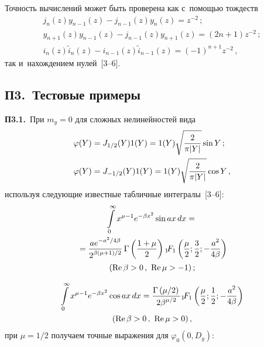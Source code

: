 \begin{multicols}{2}
{Точность вычислений может быть проверена как с~по\-мощью тождеств
    \begin{gather*}
    j_n (z) y_{n-1}(z) - j_{n-1}(z) y_n(z) = z^{-2}\,;
    \\[2pt]
    y_{n+1}(z) y_{n-1}(z) - j_{n-1}(z) y_{n+1}(z) =(2n+1) z^{-2}\,;
\\[2pt]
    i_n(z) \tilde i_n (z) - i_{n-1}(z) \tilde i_{n-1}(z) =(-1)^{n+1} z^{-2}\,,
  \end{gather*}
так и~нахождением нулей~[3--6].

\vspace*{2pt}


 


\subsection*{П3.\ Тестовые примеры}

\vspace*{6pt}


\noindent
\textbf{П3.1.}\ 
При $m_y =0$ для сложных нелинейностей вида
    \begin{align*}
    \varphi(Y) &= J_{1/2} (Y) 1(Y) = 1(Y)\sqrt{
    \displaystyle\frac{\displaystyle 2\mathstrut}{\displaystyle \pi |Y|\mathstrut}}\sin Y\,;\\
    \varphi(Y) &= J_{-1/2} (Y) 1(Y) =1(Y)\sqrt{\displaystyle\frac{\displaystyle 2\mathstrut}{\displaystyle \pi |Y|\mathstrut}}\cos Y\,,
\end{align*}
используя следующие известные табличные интегралы~[3--6]:
    \begin{multline*}
    \int\limits_0^\infty x^{\mu-1} e^{-\beta x^2} \sin  ax \,dx = {}\\
{}=    \displaystyle\frac{\displaystyle a e^{-a^2/4\beta}\mathstrut}{\displaystyle 2^{\beta(\mu+1)/2}\mathstrut}\, \Gamma 
    \left(\displaystyle\frac{\displaystyle 1+\mu\mathstrut}{\displaystyle 2\mathstrut}\right) {}_1\!F_1\left(
    \displaystyle\frac{\displaystyle \mu\mathstrut}{\displaystyle 2\mathstrut}; \displaystyle\frac{\displaystyle 3\mathstrut}{\displaystyle 2\mathstrut}; -\displaystyle\frac{\displaystyle a^2\mathstrut}{\displaystyle 4\beta\mathstrut}\right)\\ 
    (\mathrm{Re}\, \beta>0\,,\  \mathrm{Re}\, \mu>-1)\,;
   \end{multline*}
   
   \vspace*{-10pt}
   
   \noindent
\begin{multline*}
     \int\limits_0^\infty x^{\mu-1} e^{-\beta x^2} \cos a x\, dx = 
     \displaystyle\frac{\displaystyle  \Gamma \left({\mu/2}\right)\mathstrut}{\displaystyle 2\beta^{\mu/2}\mathstrut} {}_1\!F_1\left(
     \displaystyle\frac{\displaystyle \mu\mathstrut}{\displaystyle 2\mathstrut}; \displaystyle\frac{\displaystyle 1\mathstrut}{\displaystyle 2\mathstrut}; -\displaystyle\frac{\displaystyle a^2\mathstrut}{\displaystyle 4\beta\mathstrut}\right)\\ 
     (\mathrm{Re}\, \beta>0\,,\ \mathrm{Re}\, \mu>0)\,,
     \end{multline*}
при $\mu=1/2$ получаем точные выражения для  $\varphi_0 (0, D_y)$:

}
\end{multicols}
